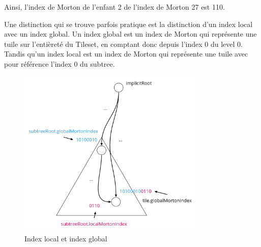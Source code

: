 Ainsi, l'index de Morton de l'enfant 2 de l'index de Morton 27 est 110.

\newpage
Une distinction qui se trouve parfois pratique est la distinction d'un index local avec un index global. Un index global est un index de Morton qui représente une tuile sur l'entièreté du Tileset, en comptant donc depuis l'index 0 du level 0. Tandis qu'un index local est un index de Morton qui représente une tuile avec pour référence l'index 0 du subtree.

\begin{figure}[H]
    \centering
    \includegraphics[width=0.8\textwidth]{assets/figures/global-to-local-morton.png}
    \caption{Index local et index global \cite{availability-gh}}
    \label{fig:xy-morton}
\end{figure}